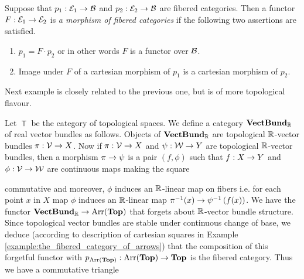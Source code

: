 \begin{definition}
Suppose that $p_1:{\mathcal E}_1\rightarrow {\mathcal B}$ and $p_2:{\mathcal E}_2\rightarrow {\mathcal B}$ are fibered categories. Then a functor $F:{\mathcal E}_1\rightarrow {\mathcal E}_2$ is \textit{a morphism of fibered categories} if the following two assertions are satisfied.
\begin{enumerate}[label=\textbf{(\arabic*)}, leftmargin=3.0em]
\item $p_1 = F\cdot p_2$ or in other words $F$ is a functor over ${\mathcal B}$.
\item Image under $F$ of a cartesian morphism of $p_1$ is a cartesian morphism of $p_2$.
\end{enumerate}
\end{definition}
\noindent
Next example is closely related to the previous one, but is of more topological flavour.

\begin{example}\label{example:the_fibered_category_of_vector_bundles}
Let $\Top$ be the category of topological spaces. We define a category $\mathbf{VectBund}_{{\mathbb R}}$ of real vector bundles as follows. Objects of $\mathbf{VectBund}_{{\mathbb R}}$ are topological ${\mathbb R}$-vector bundles $\pi:{\mathcal V} \rightarrow X$. Now if $\pi:{\mathcal V} \rightarrow X$ and $\psi:{\mathcal W} \rightarrow Y$ are topological ${\mathbb R}$-vector bundles, then a morphism $\pi\rightarrow \psi$ is a pair $(f,\phi)$ such that $f:X\rightarrow Y$ and $\phi:{\mathcal V} \rightarrow {\mathcal W}$ are continuous maps making the square
\begin{center}
\end{center}
commutative and moreover, $\phi$ induces an ${\mathbb R}$-linear map on fibers i.e. for each point $x$ in $X$ map $\phi$ induces an ${\mathbb R}$-linear map $\pi^{-1}(x)\rightarrow \psi^{-1}\left(f(x)\right)$. We have the functor $\mathbf{VectBund}_{{\mathbb R}}\rightarrow \mathrm{Arr}(\mathbf{Top})$ that forgets about ${\mathbb R}$-vector bundle structure. Since topological vector bundles are stable under continuous change of base, we deduce (according to description of cartesian squares in Example \ref{example:the_fibered_category_of_arrows}) that the composition of this forgetful functor with $p_{\mathrm{Arr}(\mathbf{Top})}:\mathrm{Arr}(\mathbf{Top})\rightarrow \mathbf{Top}$ is the fibered category. Thus we have a commutative triangle

\end{example}
